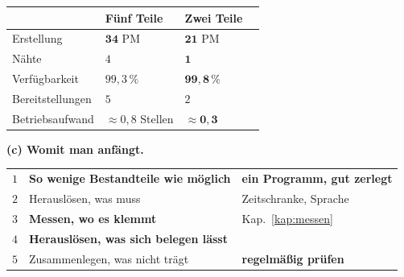 \begin{aufgabe}
\begin{center}
{\small
\renewcommand{\arraystretch}{1.45}
\begin{tabular}{@{}P{2.6cm}P{2.2cm}P{2.2cm}P{1.8cm}@{}}
\toprule
& \textbf{Fünf Teile} & \textbf{Zwei Teile} & \\
\midrule
Erstellung & $\mathbf{34}$ PM & $\mathbf{21}$ PM & \\
Nähte & $4$ & $\mathbf{1}$ & \\
Verfügbarkeit & $99{,}3\,\%$ & $\mathbf{99{,}8\,\%}$ & \\
Bereitstellungen & $5$ & $2$ & \\
Betriebsaufwand & $\approx0{,}8$ Stellen & $\approx\mathbf{0{,}3}$ & \\
\bottomrule
\end{tabular}}
\end{center}

\begin{center}
\begin{minipage}{0.88\textwidth}
\end{minipage}
\end{center}

\begin{center}
\end{center}

\medskip
\textbf{(c) Womit man anfängt.}

\begin{center}
{\small
\renewcommand{\arraystretch}{1.5}
\begin{tabular}{@{}P{1.0cm}P{3.4cm}P{3.4cm}@{}}
\toprule
$1$ & \textbf{So wenige Bestandteile wie möglich} & \textbf{ein Programm, gut zerlegt}\\
$2$ & Herauslösen, was muss & Zeitschranke, Sprache\\
$3$ & \textbf{Messen, wo es klemmt} & \textcolor{gruen}{Kap.~\ref{kap:messen}}\\
$4$ & \textbf{Herauslösen, was sich belegen lässt} & \\
$5$ & Zusammenlegen, was nicht trägt & \textcolor{gruen}{\textbf{regelmäßig prüfen}}\\
\bottomrule
\end{tabular}}
\end{center}


\end{aufgabe}
